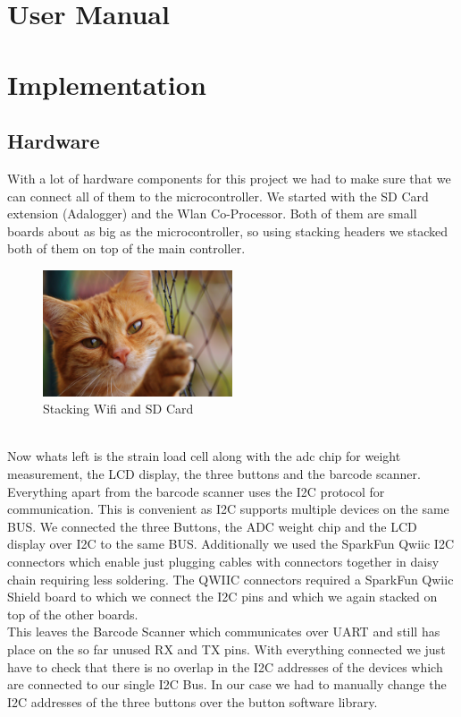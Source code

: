 \documentclass{article}
\begin{document}
\section{User Manual}
\lipsum[1]\lipsum[1]
\section{Implementation}
\subsection{Hardware}
With a lot of hardware components for this project we had to make sure that we can connect all of them to the microcontroller.
We started with the SD Card extension (Adalogger) and the Wlan Co-Processor. Both of them are small boards about as big as the microcontroller, so using stacking headers we stacked both of them on top of the main controller.\\
\begin{figure}[h]
    \centering
    \includegraphics[width=0.5\textwidth]{cat.jpg}
    \caption{Stacking Wifi and SD Card}
    \label{fig:mesh1}
\end{figure}\\
Now whats left is the strain load cell along with the adc chip for weight measurement, the LCD display, the three buttons and the barcode scanner. 
Everything apart from the barcode scanner uses the I2C protocol for communication. This is convenient as I2C supports multiple devices on the same BUS.
We connected the three Buttons, the ADC weight chip and the LCD display over I2C to the same BUS. Additionally we used the SparkFun Qwiic I2C connectors which enable just plugging cables with
connectors together in daisy chain requiring less soldering. The QWIIC connectors required a SparkFun Qwiic Shield board to which we connect the I2C pins and which we again stacked on top of the other boards.\\
This leaves the Barcode Scanner which communicates over UART and still has place on the so far unused RX and TX pins.
With everything connected we just have to check that there is no overlap in the I2C addresses of the devices which are connected to our single I2C Bus.
In our case we had to manually change the I2C addresses of the three buttons over the button software library.
\end{document}
